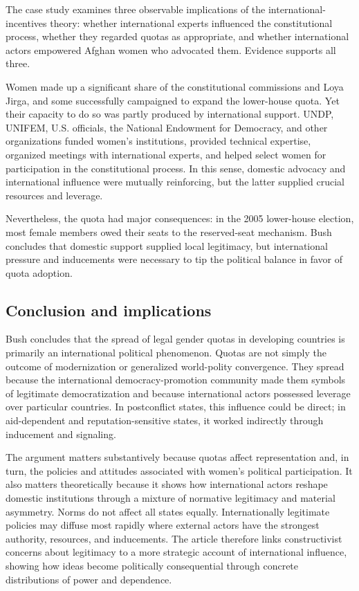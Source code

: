 The case study examines three observable implications of the international-incentives theory: whether international experts influenced the constitutional process, whether they regarded quotas as appropriate, and whether international actors empowered Afghan women who advocated them. Evidence supports all three.

Women made up a significant share of the constitutional commissions and Loya Jirga, and some successfully campaigned to expand the lower-house quota. Yet their capacity to do so was partly produced by international support. UNDP, UNIFEM, U.S. officials, the National Endowment for Democracy, and other organizations funded women's institutions, provided technical expertise, organized meetings with international experts, and helped select women for participation in the constitutional process. In this sense, domestic advocacy and international influence were mutually reinforcing, but the latter supplied crucial resources and leverage.

Nevertheless, the quota had major consequences: in the 2005 lower-house election, most female members owed their seats to the reserved-seat mechanism. Bush concludes that domestic support supplied local legitimacy, but international pressure and inducements were necessary to tip the political balance in favor of quota adoption.

\subsection{Conclusion and implications}

Bush concludes that the spread of legal gender quotas in developing countries is primarily an international political phenomenon. Quotas are not simply the outcome of modernization or generalized world-polity convergence. They spread because the international democracy-promotion community made them symbols of legitimate democratization and because international actors possessed leverage over particular countries. In postconflict states, this influence could be direct; in aid-dependent and reputation-sensitive states, it worked indirectly through inducement and signaling.

The argument matters substantively because quotas affect representation and, in turn, the policies and attitudes associated with women's political participation. It also matters theoretically because it shows how international actors reshape domestic institutions through a mixture of normative legitimacy and material asymmetry. Norms do not affect all states equally. Internationally legitimate policies may diffuse most rapidly where external actors have the strongest authority, resources, and inducements. The article therefore links constructivist concerns about legitimacy to a more strategic account of international influence, showing how ideas become politically consequential through concrete distributions of power and dependence.

